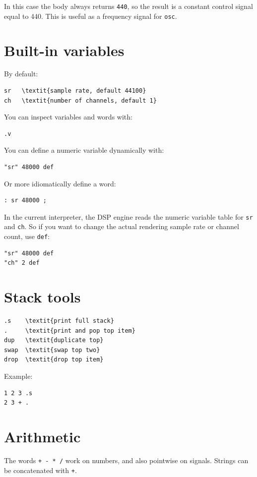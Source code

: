 \documentclass[11pt]{article}
\begin{document}
In this case the body always returns \texttt{440}, so the result is a constant control signal equal to 440. This is useful as a frequency signal for \texttt{osc}.

\section*{Built-in variables}
By default:
\begin{lstlisting}
sr   \textit{sample rate, default 44100}
ch   \textit{number of channels, default 1}
\end{lstlisting}

You can inspect variables and words with:
\begin{lstlisting}
.v
\end{lstlisting}

You can define a numeric variable dynamically with:
\begin{lstlisting}
"sr" 48000 def
\end{lstlisting}

Or more idiomatically define a word:
\begin{lstlisting}
: sr 48000 ;
\end{lstlisting}

In the current interpreter, the DSP engine reads the numeric variable table for \texttt{sr} and \texttt{ch}. So if you want to change the actual rendering sample rate or channel count, use \texttt{def}:
\begin{lstlisting}
"sr" 48000 def
"ch" 2 def
\end{lstlisting}

\section*{Stack tools}
\begin{lstlisting}
.s    \textit{print full stack}
.     \textit{print and pop top item}
dup   \textit{duplicate top}
swap  \textit{swap top two}
drop  \textit{drop top item}
\end{lstlisting}

Example:
\begin{lstlisting}
1 2 3 .s
2 3 + .
\end{lstlisting}

\section*{Arithmetic}
The words \texttt{+ - * /} work on numbers, and also pointwise on signals. Strings can be concatenated with \texttt{+}.
\end{document}
